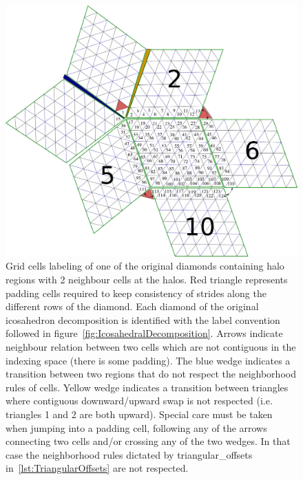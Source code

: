 \documentclass{book}
\begin{document}
\begin{figure}[htb!]
	\begin{center}
		\includegraphics[width=18cm]{fig/IcosahedralGridCellHalos_v2.png}
		\caption{
			Grid cells labeling of one of the original diamonds containing
	halo regions with 2 neighbour cells at the halos. 
	Red triangle represents padding cells required to keep consistency of strides
	along the different rows of the diamond. Each diamond of the original icosahedron 
	decomposition is identified with the label convention followed in figure~\ref{fig:IcosahedralDecomposition}.
	Arrows indicate neighbour relation between two cells which are not contiguous in the indexing space (there is some padding).
	The blue wedge indicates a transition between two regions that do
	not respect the neighborhood rules of cells.
	Yellow wedge indicates a transition between triangles where 
	contiguous downward/upward swap is not respected (i.e. triangles 1 and 2 are both upward). Special care must be taken when jumping into a padding cell, following any of the arrows connecting two cells and/or crossing any of the two wedges. In that case the neighborhood rules dictated by triangular\_offsets in~\autoref{lst:TriangularOffsets} are not respected. 
 	}
	\label{fig:IcosahedralDiamondWithHalos_1}
	\end{center}
\end{figure}
\end{document}
